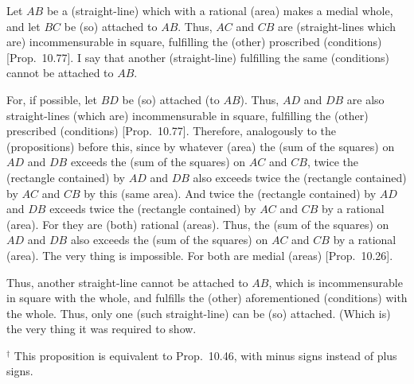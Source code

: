 \begin{Parallel}{}{}
{Let $AB$ be a (straight-line) which with a rational (area) makes a medial
whole,  and let $BC$ be (so) attached to $AB$. Thus, $AC$ and $CB$
are (straight-lines which are) incommensurable in square, fulfilling the (other) proscribed (conditions) [Prop.~10.77]. I say that another (straight-line)
fulfilling the same (conditions) cannot be attached to $AB$.

For, if possible, let $BD$ be (so) attached (to $AB$). Thus, $AD$ and
$DB$ are also straight-lines (which are) incommensurable in square,
fulfilling the (other) prescribed  (conditions) [Prop.~10.77]. Therefore, analogously to the
(propositions) before this, since by whatever (area)
the (sum of the squares) on $AD$ and $DB$ exceeds the (sum of the
squares) on $AC$ and $CB$,  twice the (rectangle contained)
by $AD$ and $DB$ also exceeds twice the (rectangle contained) by
$AC$ and $CB$ by this (same area). And twice the (rectangle contained) by $AD$ and
$DB$ exceeds twice the (rectangle contained) by $AC$ and
$CB$ by a rational (area). For they are (both) rational (areas).
Thus, the (sum of the squares) on 
$AD$ and $DB$ also exceeds the (sum of the squares) on $AC$ and $CB$
by a rational (area). The very thing is impossible. For both are
medial (areas) [Prop.~10.26].

 Thus, another
straight-line cannot be attached to $AB$, which is incommensurable
in square with the whole, and fulfills the (other) aforementioned (conditions) with the
whole. Thus, only one (such straight-line) can be (so) attached. (Which is)
the very thing it was required to show.}
\end{Parallel}
{\footnotesize\noindent$^\dag$
This proposition is equivalent to Prop.~10.46, with minus signs instead of
plus signs.}

